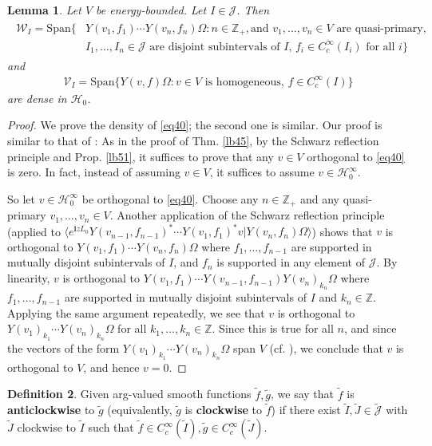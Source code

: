 \documentclass[11pt,b5paper,notitlepage]{article}
\theoremstyle{definition}
\newtheorem{df}{Definition}[section]
\theoremstyle{plain}
\newtheorem{lm}[df]{Lemma}
\newcommand{\mc}{\mathcal}
\newcommand{\wtd}{\widetilde}
\newcommand{\ovl}{\overline}
\newcommand{\Span}{\mathrm{Span}}
\newcommand{\bk}[1]{\langle {#1}\rangle}
\newcommand{\Jtd}{\widetilde{\mathcal J}}
\newcommand{\im}{\mathbf{i}}
\newcommand{\Zbb}{\mathbb Z}
\numberwithin{equation}{section}
\begin{document}
\begin{lm}\label{lb55}
Let $V$ be energy-bounded. Let $I\in\mc J$. Then
\begin{align}
\begin{aligned}\label{eq40}
\mc W_I=\Span\{&Y(v_1,f_1)\cdots Y(v_n,f_n)\Omega:n\in\Zbb_+,\text{and }v_1,\dots,v_n\in V\text{ are quasi-primary, }\\
&I_1,\dots,I_n\in\mc J\text{ are disjoint subintervals of $I$, }f_i\in C_c^\infty(I_i)\text{ for all }i\}
\end{aligned}
  \end{align}
and
\begin{align}\label{eq44}
\mc V_I=\Span\{Y(v,f)\Omega:v\in V\text{ is homogeneous, }f\in C_c^\infty(I) \}
\end{align}
are dense in $\mc H_0$.
\end{lm}

\begin{proof}
We prove the density of \eqref{eq40}; the second one is similar. Our proof is similar to that of \cite[Thm. 8.1]{CKLW18}: As in the proof of Thm. \ref{lb45}, by the Schwarz reflection principle  and Prop. \ref{lb51}, it suffices to prove that any $v\in V$ orthogonal to \eqref{eq40} is zero.  In fact, instead of assuming $v\in V$, it suffices to assume $v\in \mc H_0^\infty$.

So let $v\in \mc H_0^\infty$ be orthogonal to \eqref{eq40}. Choose any $n\in\Zbb_+$ and any quasi-primary $v_1,\dots,v_n\in V$. Another application of the Schwarz reflection principle (applied to $\bk{e^{\im z\ovl{L_0}}Y(v_{n-1},f_{n-1})^*\cdots Y(v_1,f_1)^*v|Y(v_n,f_n)\Omega}$) shows that $v$ is orthogonal to $Y(v_1,f_1)\cdots Y(v_n,f_n)\Omega$ where $f_1,\dots,f_{n-1}$ are supported in mutually disjoint subintervals of $I$, and $f_n$ is supported in any element of $\mc J$. By linearity, $v$ is orthogonal to $Y(v_1,f_1)\cdots Y(v_{n-1},f_{n-1})Y(v_n)_{k_n}\Omega$ where $f_1,\dots,f_{n-1}$ are supported in mutually disjoint subintervals of $I$ and $k_n\in\Zbb$. Applying the same argument repeatedly, we see that $v$ is orthogonal to $Y(v_1)_{k_1}\cdots Y(v_n)_{k_n}\Omega$ for all $k_1,\dots,k_n\in\Zbb$. Since this is true for all $n$, and since the vectors of the form $Y(v_1)_{k_1}\cdots Y(v_n)_{k_n}\Omega$ span $V$ (cf. \cite[Prop. 6.6]{CKLW18}), we conclude that $v$ is orthogonal to $V$, and hence $v=0$.
\end{proof}


\begin{df}\label{lb82}
Given arg-valued smooth functions $\wtd f,\wtd g$, we say that $\wtd f$ is \textbf{anticlockwise} to $\wtd g$ (equivalently, $\wtd g$ is \textbf{clockwise} to $\wtd f$) if there exist $\wtd I,\wtd J\in\Jtd$ with $\wtd J$ clockwise to $\wtd I$ such that $\wtd f\in C_c^\infty(\wtd I),\wtd g\in C_c^\infty (\wtd J)$. 
\end{df}
\end{document}
